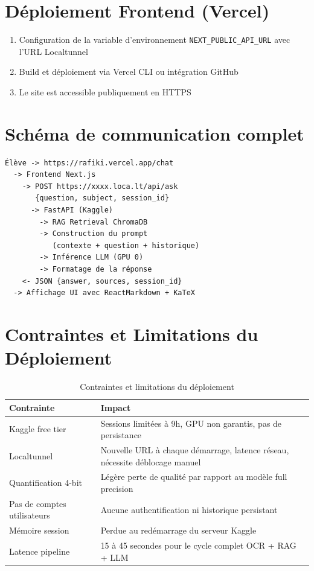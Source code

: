 \documentclass[12pt,a4paper]{report}
\begin{document}
\section{Déploiement Frontend (Vercel)}
\begin{enumerate}
    \item Configuration de la variable d'environnement \texttt{NEXT\_PUBLIC\_API\_URL} avec l'URL Localtunnel
    \item Build et déploiement via Vercel CLI ou intégration GitHub
    \item Le site est accessible publiquement en HTTPS
\end{enumerate}

\section{Schéma de communication complet}
\begin{verbatim}
Élève -> https://rafiki.vercel.app/chat
  -> Frontend Next.js
    -> POST https://xxxx.loca.lt/api/ask 
       {question, subject, session_id}
      -> FastAPI (Kaggle)
        -> RAG Retrieval ChromaDB
        -> Construction du prompt
           (contexte + question + historique)
        -> Inférence LLM (GPU 0)
        -> Formatage de la réponse
    <- JSON {answer, sources, session_id}
  -> Affichage UI avec ReactMarkdown + KaTeX
\end{verbatim}

\section{Contraintes et Limitations du Déploiement}
\begin{table}[h!]
    \centering
    \begin{tabular}{p{5cm} p{9cm}}
        \toprule
        \textbf{Contrainte} & \textbf{Impact} \\
        \midrule
        Kaggle free tier & Sessions limitées à 9h, GPU non garantis, pas de persistance \\
        Localtunnel & Nouvelle URL à chaque démarrage, latence réseau, nécessite déblocage manuel \\
        Quantification 4-bit & Légère perte de qualité par rapport au modèle full precision \\
        Pas de comptes utilisateurs & Aucune authentification ni historique persistant \\
        Mémoire session & Perdue au redémarrage du serveur Kaggle \\
        Latence pipeline & 15 à 45 secondes pour le cycle complet OCR + RAG + LLM \\
        \bottomrule
    \end{tabular}
    \caption{Contraintes et limitations du déploiement}
\end{table}
\end{document}
